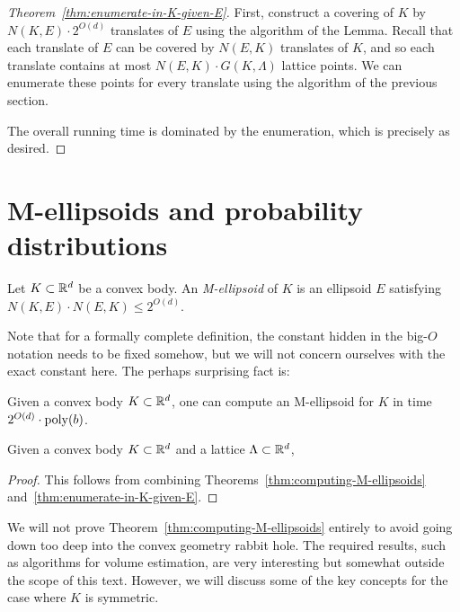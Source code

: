 \begin{proof}[Theorem~\ref{thm:enumerate-in-K-given-E}]
  First, construct a covering of $K$ by $N(K,E) \cdot 2^{O(d)}$ translates of $E$ using the algorithm of the Lemma.
  Recall that each translate of $E$ can be covered by $N(E,K)$ translates of $K$,
  and so each translate contains at most $N(E,K) \cdot G(K,\Lambda)$ lattice points.
  We can enumerate these points for every translate using the algorithm of the previous section.
  
  The overall running time is dominated by the enumeration,
  which is precisely as desired.
\end{proof}


\section{M-ellipsoids and probability distributions}

\begin{definition}
  Let $K \subset \mathbb{R}^d$ be a convex body.
  An \emph{M-ellipsoid} of $K$ is an ellipsoid $E$ satisfying
  $N(K,E) \cdot N(E,K) \leq 2^{O(d)}$.
\end{definition}

Note that for a formally complete definition,
the constant hidden in the big-$O$ notation needs to be fixed somehow,
but we will not concern ourselves with the exact constant here.
The perhaps surprising fact is:

\begin{theorem}
  \label{thm:computing-M-ellipsoids}
  Given a convex body $K \subset \mathbb{R}^d$,
  one can compute an M-ellipsoid for $K$
  in time $2^{O(d)} \cdot \operatorname{poly}(b)$.
\end{theorem}

\begin{corollary}
  Given a convex body $K \subset \mathbb{R}^d$ and a lattice $\Lambda \subset \mathbb{R}^d$,
\end{corollary}
\begin{proof}
  This follows from combining Theorems~\ref{thm:computing-M-ellipsoids} and~\ref{thm:enumerate-in-K-given-E}.
\end{proof}

We will not prove Theorem~\ref{thm:computing-M-ellipsoids} entirely
to avoid going down too deep into the convex geometry rabbit hole.
The required results, such as algorithms for volume estimation,
are very interesting but somewhat outside the scope of this text.
However, we will discuss some of the key concepts for the case where $K$ is symmetric.

